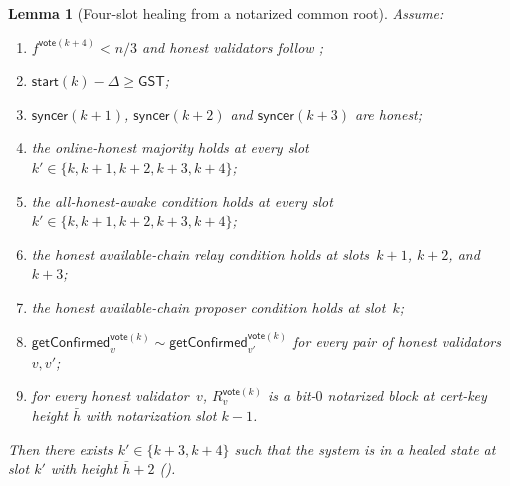 \ifx\litemode\undefined\documentclass{article}\fi
\newcommand{\syncer}{\mathsf{syncer}}
\newcommand{\start}{\mathsf{start}}
\newcommand{\vote}{\mathsf{vote}}
\newcommand{\comm}[1]{\bar{#1}}
\newcommand{\getConfirmed}{\textsf{getConfirmed}\xspace}
\theoremstyle{plain}
\newtheorem{lemma}{Lemma}
\theoremstyle{definition}
\theoremstyle{remark}
\newcommand{\GST}{\ensuremath{\mathsf{GST}}}
\newcommand{\OHM}{online-honest majority\xspace}
\newcommand{\HAP}{honest available-chain proposer\xspace}
\newcommand{\HAR}{honest available-chain relay\xspace}
\newcommand{\AHA}{all-honest-awake\xspace}
\begin{document}
\begin{lemma}[Four-slot healing from a notarized common root]\label{rev:lem:healing-four-slot-from-notarized}
Assume:
\begin{enumerate}
  \item $f^{\vote(k+4)} < n/3$ and honest validators follow ;
  \item $\start(k) - \Delta \geq \GST$;
  \item $\syncer(k+1)$, $\syncer(k+2)$ and $\syncer(k+3)$ are honest;
  \item the \OHM holds at every slot $k' \in \{k, k+1, k+2, k+3, k+4\}$;
  \item the \AHA condition holds at every slot $k' \in \{k, k+1, k+2, k+3, k+4\}$;
  \item the \HAR condition holds at slots~$k+1$, $k+2$, and $k+3$;
  \item the \HAP condition holds at slot~$k$;
  \item $\getConfirmed_v^{\vote(k)} \sim \getConfirmed_{v'}^{\vote(k)}$ for every pair of honest validators~$v, v'$;
  \item for every honest validator~$v$, $R_v^{\vote(k)}$ is a bit-$0$ notarized block at cert-key height $\comm{h}$ with notarization slot $k-1$.
\end{enumerate}
Then there exists $k' \in \{k+3, k+4\}$ such that the system is in a healed state at slot $k'$ with height $\comm{h}+2$ ().
\end{lemma}
\end{document}

